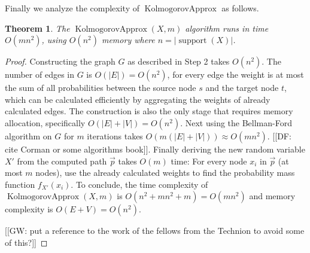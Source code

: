 \documentclass{article}
\newtheorem{theorem}[thm]{Theorem}
\DeclareMathOperator{\support}{support}
\DeclareMathOperator{\KlmApprox}{KolmogorovApprox}
\begin{document}
Finally we analyze the complexity of $\KlmApprox$ as follows.


\begin{theorem}\label{the:complexity}
	The $\KlmApprox(X,m)$ algorithm runs in time $O(mn^2)$, using $O(n^2)$ memory where $n=|\support(X)|$.
\end{theorem}

\begin{proof}
	Constructing the graph $G$ as described in Step 2 takes $O(n^2)$. The number of edges in $G$ is $O(|E|)=O(n^2)$, for every edge the weight is at most the sum of all probabilities between the source node $s$ and the target node $t$, which can be calculated efficiently by aggregating the weights of already calculated edges. 
	The construction is also the only stage that requires memory allocation, specifically $O(|E|+|V|)=O(n^2)$.
	Next using the Bellman-Ford algorithm on $G$ for $m$ iterations   takes $O(m(|E|+|V|))\approx O(mn^2)$. [[DF: cite Corman or some algorithms book]]. 
	Finally deriving the new random variable $X'$ from the computed path $\vec{p}$ takes $O(m)$ time: For every node $x_i$ in $\vec{p}$ (at most $m$ nodes), use the already calculated weights to find the probability mass function $f_{X'}(x_i)$. 
	To conclude, the time complexity  of $\KlmApprox(X,m)$ is $O(n^2+mn^2+m)=O(mn^2)$ and memory complexity is $O(E+V)=O(n^2)$.
	
	[[GW: put a reference to the work of the fellows from the Technion to avoid some of this?]]

	
\end{proof}






\end{document}
